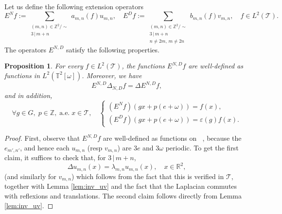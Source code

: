 \documentclass[a4paper,11pt]{amsart}
\numberwithin{equation}{section}
\newtheorem{prop}[thm]{Proposition}
\theoremstyle{definition}
\DeclareMathOperator{\tori}{\mathbb T^2[\omega]}
\begin{document}
Let us define the following extension operators
$$
E^N f := \sum_{\substack{(m, n) \in \mathbb Z^2/\sim \\ 3 \,|\,m+n}}  a_{m,n}(f) u_{m,n}, \quad
E^D f := \sum_{\substack{(m, n) \in \mathbb Z^2/\sim \\ 3 \,|\,m+n \\ n\neq 2m,\, m\neq 2n}}  b_{m,n}(f) v_{m,n},\quad
f \in L^2(\mathcal T).
$$
The operators $E^{N,D}$ satisfy the following properties.

\begin{prop} \label{prop:TtoTor}
For every $f \in L^2(\mathcal T)$, the functions $E^{N,D}f$ are well-defined as functions in $L^2(\mathbb T^2[\omega])$. Moreover, we have
$$
E^{N,D} \Delta_{N,D} f = \Delta E^{N,D} f,
$$
and in addition, 
$$
\forall g \in G, \; p \in \mathbb Z, \; \text{a.e.} \; x \in \mathcal T, \quad 
\begin{cases}
(E^{N}f)(g x + p(e+\omega)) = f(x), \\[5pt]
(E^{D}f)(g x + p(e+\omega)) = \varepsilon(g) f(x).
\end{cases}
$$
\end{prop}
\begin{proof}
First, observe that $E^{N,D} f$ are well-defined as functions on $\tori$, because the $e_{m',n'}$, and hence each $u_{m,n}$ (resp $v_{m,n}$) are $3e$ and $3\omega$ periodic.
To get the first claim, it suffices to check that, for $3 \, | \, m+n$,
$$
\Delta u_{m,n}(x) = \lambda_{m,n}  u_{m,n}(x), \quad x \in \mathbb R^2,
$$
(and similarly for $v_{m,n}$) which follows from the fact that this is verified in $\mathcal T$, together with Lemma \ref{lem:inv_uv} and the fact that the Laplacian commutes with reflexions and translations.
The second claim follows directly from Lemma \ref{lem:inv_uv}.
\end{proof}
\end{document}
